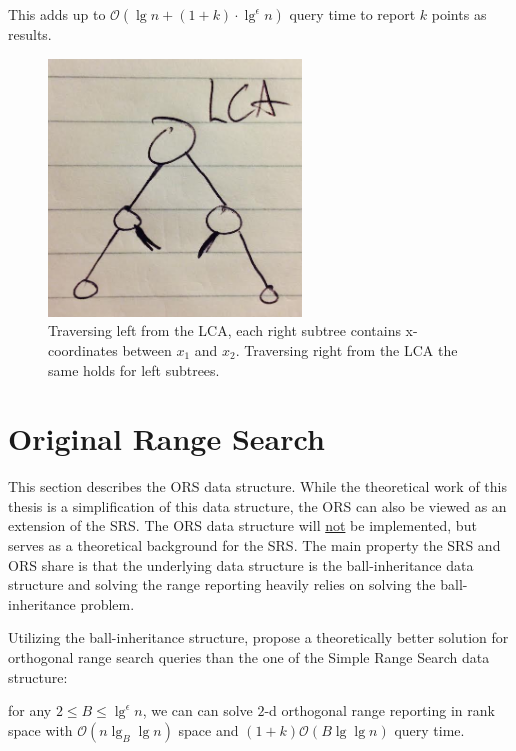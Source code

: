 This adds up to $\mathcal{O}(\lg n + (1+k)\cdot\lg^\epsilon n)$ query time to report $k$ points as results. 

\begin{figure}[H]
    \centering
    \includegraphics[width=0.6\textwidth]{pictures/LCA.png}
    \caption{Traversing left from the LCA, each right subtree contains x-coordinates between $x_1$ and $x_2$. Traversing right from the LCA the same holds for left subtrees.}
    \label{fig:LCA}
\end{figure}


\section{Original Range Search}
\label{sect:original}

This section describes the ORS data structure. While the theoretical work of this thesis is a simplification of this data structure, the ORS can also be viewed as an extension of the SRS. The ORS data structure will \underline{not} be implemented, but serves as a theoretical background for the SRS. The main property the SRS and ORS share is that the underlying data structure is the ball-inheritance data structure and solving the range reporting heavily relies on solving the ball-inheritance problem.

Utilizing the ball-inheritance structure, \citet{chanetal} propose a theoretically better solution for orthogonal range search queries than the one of the Simple Range Search data structure: 
\begin{customthm}{2.1}\label{theorem21}
for any $2 \leq B \leq \lg^\epsilon n$, we can can solve $2$-d orthogonal range reporting in rank space with $\mathcal{O}(n \lg_B \lg n)$ space and $(1+k)\mathcal{O}(B \lg \lg n)$ query time.
\end{customthm}

